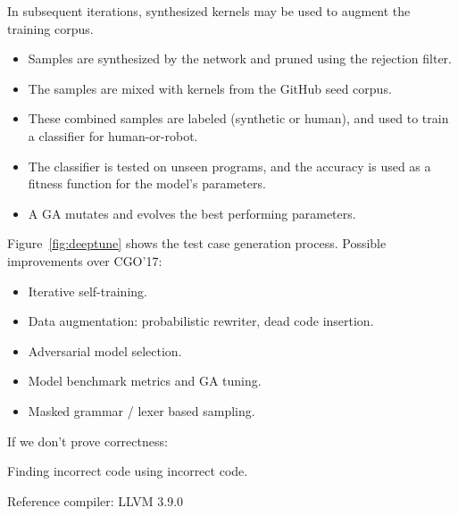 In subsequent iterations, synthesized kernels may be used to augment the training corpus.

\begin{itemize}
\item Samples are synthesized by the network and pruned using the rejection filter.
\item The samples are mixed with kernels from the GitHub seed corpus.
\item These combined samples are labeled (synthetic or human), and used to train a classifier for human-or-robot.
\item The classifier is tested on unseen programs, and the accuracy is used as a fitness function for the model's parameters.
\item A GA mutates and evolves the best performing parameters.
\end{itemize}

Figure~\ref{fig:deeptune} shows the test case generation process. Possible improvements over CGO'17:

\begin{itemize}
        \item Iterative self-training.
        \item Data augmentation: probabilistic rewriter, dead code insertion.
        \item Adversarial model selection.
        \item Model benchmark metrics and GA tuning.
        \item Masked grammar / lexer based sampling.
\end{itemize}

\noindent If we don't prove correctness:

Finding incorrect code using incorrect code.

Reference compiler: LLVM 3.9.0


